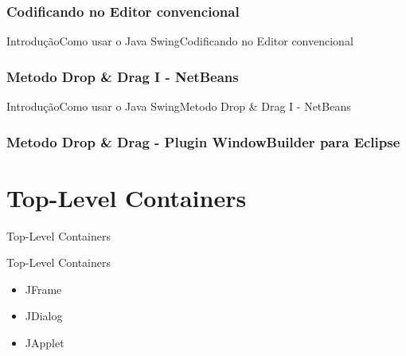 \documentclass[10pt]{beamer}
\begin{document}
\subsubsection{Codificando no Editor convencional}
\begin{frame}{Introdução}{Como usar o Java Swing}{Codificando no Editor convencional}

\end{frame}{}
\subsubsection{Metodo Drop \& Drag I - NetBeans}
\begin{frame}{Introdução}{Como usar o Java Swing}{Metodo Drop \& Drag I - NetBeans}
\end{frame}{}
\subsubsection{Metodo Drop \& Drag - Plugin WindowBuilder para Eclipse}
\begin{frame}
\end{frame}{}


			
\section{Top-Level Containers}
\begin{frame}{Top-Level Containers}{}
\end{frame}{}
\begin{frame}{Top-Level Containers}
\begin{itemize}
\item JFrame
\item JDialog
\item JApplet
\end{itemize}
\end{frame}{}
\end{document}
